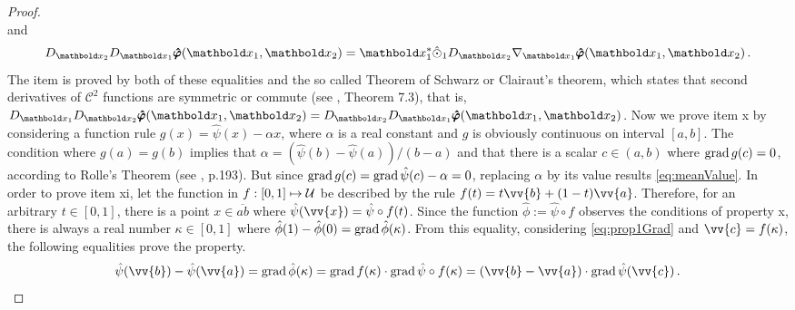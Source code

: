 {\begin{proof}
\begin{equation*}
\end{equation*}
and 
\begin{equation*}
D_{\vto{x}_2}D_{\vto{x}_1}\tnr{\hat{\varphi}}(\vto{x}_1,\vto{x}_2) = \vto{x}_1^*\hat{\odot}_1\fua{ D_{\vto{x}_2}\nabla_{\vto{x}_1}\tnr{\hat{\varphi}}}{\vto{x}_1,\vto{x}_2}\,.
\end{equation*}
The item is proved by both of these equalities and the so called Theorem of Schwarz or Clairaut's theorem, which states that second derivatives of $\mathcal{C}^2$ functions are symmetric or commute (see \cite{lang_1993_3}, Theorem 7.3), that is, $D_{\vto{x}_1}D_{\vto{x}_2}\tnr{\hat{\varphi}}(\vto{x}_1,\vto{x}_2)=D_{\vto{x}_2}D_{\vto{x}_1}\tnr{\hat{\varphi}}(\vto{x}_1,\vto{x}_2)$. Now we prove item x by considering a function rule $g(x)=\hat{\psi}(x)-\alpha x$, where $\alpha$ is a real constant and $g$ is obviously continuous on interval $[a,b]$. The condition where $g(a)=g(b)$ implies that $\alpha=(\hat{\psi}(b)-\hat{\psi}(a))/(b-a)$ and that there is a scalar $c\in(a,b)$ where $\operatorname{grad}{g(c)}=0$, according to Rolle's Theorem (see \cite{spivak_2008_1}, p.193). But since $\operatorname{grad}{g(c)}=\operatorname{grad}{{\hat{\psi}}(c)}-\alpha=0$, replacing $\alpha$ by its value results \eqref{eq:meanValue}. In order to prove item xi, let the function in $f : [0,1] \mapsto \mathcal{U}$ be described by the rule $f(t)=t\vv{b}+(1-t)\vv{a}$. Therefore, for an arbitrary $t\in[0,1]$, there is a point $x\in\overline{ab}$ where $\hat{\psi}(\vv{x})=\hat{\psi}\circ f(t)$. Since the function $\hat{\phi}:=\hat{\psi}\circ f$ observes the conditions of property x, there is always a real number $\kappa\in[0,1]$ where $\hat{\phi}(1)-\hat{\phi}(0)=\operatorname{grad}{{\hat{\phi}}(\kappa)}$. From this equality, considering \eqref{eq:prop1Grad} and $\vv{c}=f(\kappa)$, the following equalities prove the property.
\begin{equation*}
\hat{\psi}(\vv{b})-\hat{\psi}(\vv{a})=\grad{\fua{{\hat{\phi}}}{\kappa}}=\grad{f}(\kappa)\cdot\grad{\fua{{\hat{\psi}\circ f}}{\kappa}}=(\vv{b}-\vv{a})\cdot\grad{\fua{{\hat{\psi}}}{\vv{c}}}\,.
\end{equation*}
\end{proof}}



